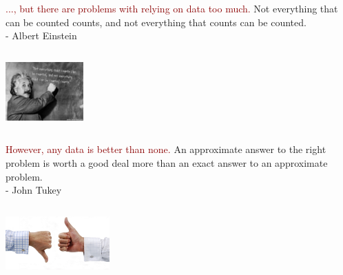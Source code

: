 \documentclass{beamer}
\begin{document}
\begin{frame}
\begin{columns}
\column{28em}
\vspace{2cm}
\begin{block}{\centering\textcolor{darkred}{..., but there are problems with relying on data too much.}}
\justifying
Not everything that can be counted counts, and not everything that counts can be counted.\\
\vspace{.2cm}
\hspace*{8.5cm}\footnotesize{- Albert Einstein}
\end{block}
\end{columns}
\vspace{.75cm}
\hspace*{8.5cm}\includegraphics[width=3cm]{figs/einstein.pdf}
\end{frame}



\begin{frame}
\begin{columns}
\column{28em}
\vspace{2cm}
\begin{block}{\centering\textcolor{darkred}{However, any data is better than none.}}
\justifying
An approximate answer to the right problem is worth a good deal more than an exact answer to an approximate problem.\\
\vspace{.2cm}
\hspace*{8.7cm}\footnotesize{- John Tukey}
\end{block}
\end{columns}
\vspace{.75cm}
\hspace*{8cm}\includegraphics[width=4cm]{figs/deal.pdf}
\end{frame}
\end{document}
